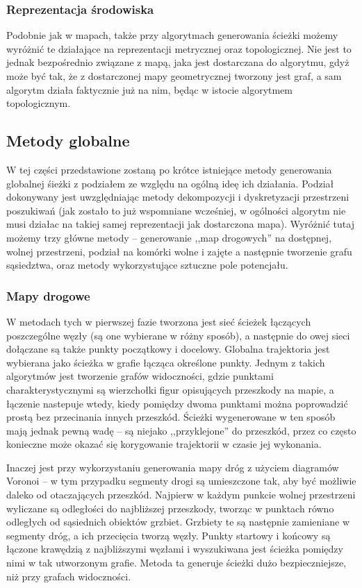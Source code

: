 \subsubsection{Reprezentacja środowiska}

Podobnie jak w mapach, także przy algorytmach generowania ścieżki możemy wyróżnić
te działające na reprezentacji metrycznej oraz topologicznej. Nie jest to jednak
bezpośrednio związane z mapą, jaka jest dostarczana do algorytmu, gdyż może być tak,
że z dostarczonej mapy geometrycznej tworzony jest graf, a sam algorytm działa faktycznie
już na nim, będąc w istocie algorytmem topologicznym.

\subsection{Metody globalne}

W tej części przedstawione zostaną po krótce istniejące metody generowania globalnej
śieżki z podziałem ze względu na ogólną ideę ich działania. Podział dokonywany
jest uwzględniając metody dekompozycji i dyskretyzacji przestrzeni poszukiwań (jak zostało
to już wspomniane wcześniej, w ogólności algorytm nie musi działac na takiej samej reprezentacji
jak dostarczona mapa). Wyróżnić tutaj możemy trzy główne metody -- generowanie
,,map drogowych'' na dostępnej, wolnej przestrzeni, podział na komórki wolne i zajęte
a następnie tworzenie grafu sąsiedztwa, oraz metody wykorzystujące sztuczne pole potencjału.

\subsubsection{Mapy drogowe}

W metodach tych w pierwszej fazie tworzona jest sieć ścieżek łączących poszczególne
węzły (są one wybierane w różny sposób), a następnie do owej sieci dołączane są
także punkty początkowy i docelowy. Globalna trajektoria jest wybierana jako ścieżka
w grafie łącząca określone punkty. Jednym z takich algorytmów jest tworzenie grafów
widoczności, gdzie punktami charakterystycznymi są wierzchołki figur opisujących
przeszkody na mapie, a łączenie nastepuje wtedy, kiedy pomiędzy dwoma punktami można
poprowadzić prostą bez przecinania innych przeszkód. Ścieżki wygenerowane w ten sposób
mają jednak pewną wadę -- są niejako ,,przyklejone'' do przeszkód, przez co często
konieczne może okazać się korygowanie trajektorii w czasie jej wykonania.

Inaczej jest przy wykorzystaniu generowania mapy dróg z użyciem diagramów Voronoi -- w tym
przypadku segmenty drogi są umieszczone tak, aby być możliwie daleko od otaczających
przeszkód. Najpierw w każdym punkcie wolnej przestrzeni wyliczane są odległości
do najbliższej przeszkody, tworząc w punktach równo odległych od sąsiednich obiektów
grzbiet. Grzbiety te są następnie zamieniane w segmenty dróg, a ich przecięcia tworzą
węzły. Punkty startowy i końcowy są łączone krawędzią z najbliższymi węzłami i wyszukiwana
jest ścieżka pomiędzy nimi w tak utworzonym grafie. Metoda ta generuje ścieżki
dużo bezpieczniejsze, niż przy grafach widoczności.

